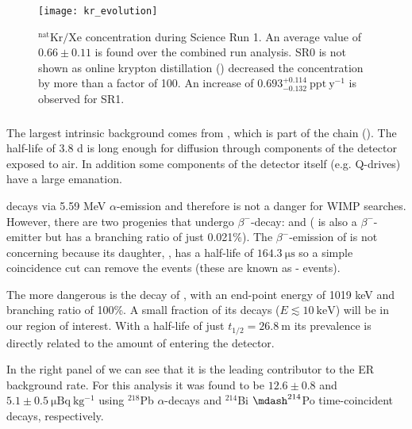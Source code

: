 \begin{figure}
\centering
\texttt{[image: kr\_evolution]}
\caption{$\mathrm{^{nat}Kr / Xe}$ concentration during Science Run 1.  An average value of $0.66 \pm 0.11$ is found over the combined
run analysis.  SR0 is not shown as online krypton distillation () decreased the concentration by more than
a factor of 100.  An increase of $0.693_{-0.132}^{+0.114}\ \mathrm{ppt\ y^{-1}}$ is observed for SR1.}
\label{fig:backgrounds_electronic_krypton_rate_increase}
\end{figure}

\subsubsection{}
\label{subsubsec:backgrounds_electronic_radon}
The largest intrinsic background comes from , which is part of the  chain
().  The half-life of 3.8 d is long enough for diffusion through components of the detector exposed
to air.  In addition some components of the detector itself (e.g. Q-drives) have a large  emanation.

decays via 5.59 MeV $\alpha$-emission and therefore is not a danger for WIMP searches.  However, there are two progenies that undergo
$\beta^-$-decay:  and  ( is also a $\beta^-$-emitter but has a branching ratio of just
0.021\%).  The $\beta^-$-emission of  is not concerning because its daughter, , has a half-life of
$164.3\ \mathrm{\mu s}$ so a simple coincidence cut can remove the events (these are known as - events).

The more dangerous is the decay of , with an end-point energy of 1019 keV and branching ratio of 100\%.  A small fraction of
its decays ($E \lesssim 10\ \mathrm{keV}$) will be in our region of interest.  With a half-life of just $t_{1/2} = 26.8\ \mathrm{m}$ its
prevalence is directly related to the amount of  entering the detector.

In the right panel of  we can see that it is the leading contributor to
the ER background rate.  For this analysis it was found to be $12.6 \pm 0.8$ and $5.1 \pm 0.5\ \mathrm{\mu Bq\ kg^{-1}}$ using $^{218}$Pb
$\alpha$-decays and $^{214}$Bi $\mdash ^{214}$Po time-coincident decays, respectively.

